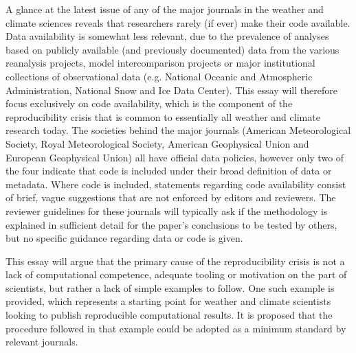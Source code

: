 A glance at the latest issue of any of the major journals in the weather and climate sciences reveals that researchers rarely (if ever) make their code available. Data availability is somewhat less relevant, due to the prevalence of analyses based on publicly available (and previously documented) data from the various reanalysis projects, model intercomparison projects or major institutional collections of observational data (e.g. National Oceanic and Atmospheric Administration, National Snow and Ice Data Center). This essay will therefore focus exclusively on code availability, which is the component of the reproducibility crisis that is common to essentially all weather and climate research today. The societies behind the major journals (American Meteorological Society, Royal Meteorological Society, American Geophysical Union and European Geophysical Union) all have official data policies, however only two of the four indicate that code is included under their broad definition of data or metadata. Where code is included, statements regarding code availability consist of brief, vague suggestions that are not enforced by editors and reviewers. The reviewer guidelines for these journals will typically ask if the methodology is explained in sufficient detail for the paper's conclusions to be tested by others, but no specific guidance regarding data or code is given. 

This essay will argue that the primary cause of the reproducibility crisis is not a lack of computational competence, adequate tooling or motivation on the part of scientists, but rather a lack of simple examples to follow. One such example is provided, which represents a starting point for weather and climate scientists looking to publish reproducible computational results. It is proposed that the procedure followed in that example could be adopted as a minimum standard by relevant journals.
